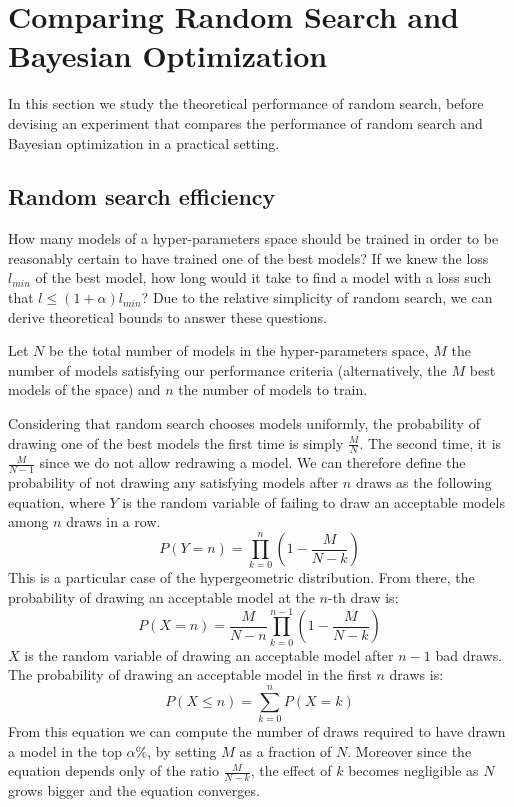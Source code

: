\section{Comparing Random Search and Bayesian Optimization}
\label{sec:compare}

In this section we study the theoretical performance of random search, before devising an experiment that compares the performance of random search and Bayesian optimization in a practical setting.

\subsection{Random search efficiency}
\label{ssec:random}

How many models of a hyper-parameters space should be trained in order to be reasonably certain to have trained one of the best models? If we knew the loss $l_{min}$ of the best model, how long would it take to find a model with a loss such that $l \leq (1 + \alpha) l_{min}$? Due to the relative simplicity of random search, we can derive theoretical bounds to answer these questions.

Let $N$ be the total number of models in the hyper-parameters space, $M$ the number of models satisfying our performance criteria (alternatively, the $M$ best models of the space) and $n$ the number of models to train.

Considering that random search chooses models uniformly, the probability of drawing one of the best models the first time is simply $\frac{M}{N}$. The second time, it is $\frac{M}{N - 1}$ since we do not allow redrawing a model. We can therefore define the probability of not drawing any satisfying models after $n$ draws as the following equation, where $Y$ is the random variable of failing to draw an acceptable models among $n$ draws in a row.
\begin{equation}
    P \left( Y = n \right) = \prod_{k = 0}^{n} \left( 1 -  \frac{M}{N - k} \right)
\end{equation}
This is a particular case of the hypergeometric distribution. From there, the probability of drawing an acceptable model at the $n$-th draw is:
\begin{equation}
    P\left(X = n \right) = \frac{M}{N - n} \prod_{k = 0}^{n - 1} \left( 1 -  \frac{M}{N - k} \right)
\end{equation}
$X$ is the random variable of drawing an acceptable model after $n - 1$ bad draws. The probability of drawing an acceptable model in the first $n$ draws is:
\begin{equation}
    P\left(X \leq n \right) = \sum_{k = 0}^{n} P\left(X = k \right)
\end{equation}
From this equation we can compute the number of draws required to have drawn a model in the top $\alpha \%$, by setting $M$ as a fraction of $N$. Moreover since the equation depends only of the ratio $\frac{M}{N - k}$, the effect of $k$ becomes negligible as $N$ grows bigger and the equation converges.

